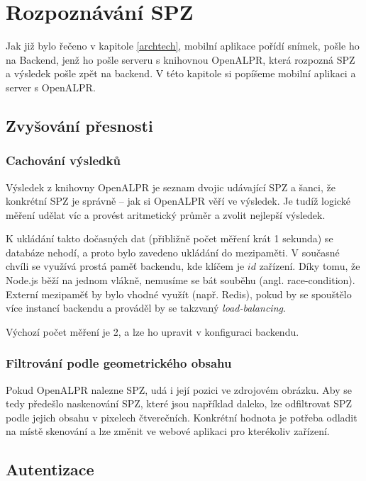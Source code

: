 
\chapter{Rozpoznávání SPZ}

\noindent
Jak již bylo řečeno v kapitole \ref{archtech}, mobilní aplikace pořídí snímek,
pošle ho na Backend, jenž ho pošle serveru s knihovnou OpenALPR, která
rozpozná SPZ a výsledek pošle zpět na backend. V této kapitole si popíšeme
mobilní aplikaci a server s OpenALPR.

\section{Zvyšování přesnosti}

\subsection{Cachování výsledků}

\noindent
Výsledek z knihovny OpenALPR je seznam dvojic udávající SPZ a šanci, že konkrétní SPZ je správně --
jak si OpenALPR věří ve výsledek. Je tudíž logické měření udělat víc a provést aritmetický průměr a
zvolit nejlepší výsledek.

K ukládání takto dočasných dat (přibližně počet měření krát 1 sekunda) se databáze nehodí, a proto
bylo zavedeno ukládání do mezipaměti. V současné chvíli se využívá prostá paměť backendu,
kde klíčem je $id$ zařízení. Díky tomu, že Node.js běží na jednom vlákně, nemusíme se bát souběhu
(angl. race-condition). Externí mezipaměť by bylo vhodné využít (např. Redis), pokud by se spouštělo více
instancí backendu a prováděl by se takzvaný \textit{load-balancing}.

Výchozí počet měření je 2, a lze ho upravit v konfiguraci backendu.

\subsection{Filtrování podle geometrického obsahu}

\noindent
Pokud OpenALPR nalezne SPZ, udá i její pozici ve zdrojovém obrázku.
Aby se tedy předešlo naskenování SPZ, které jsou například daleko, lze odfiltrovat SPZ
podle jejich obsahu v pixelech čtverečních. Konkrétní hodnota je potřeba odladit na místě skenování a
lze změnit ve webové aplikaci pro kterékoliv zařízení.


\section{Autentizace}


